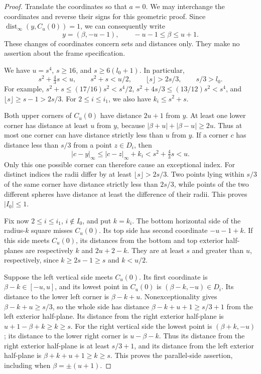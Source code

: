 \begin{proof}
Translate the coordinates so that \(a=0\).  We may interchange the
coordinates and reverse their signs for this geometric proof.  Since
\(\operatorname{dist}_\infty(y,C_u(0))=1\), we can consequently write
\[
 y=(\beta,-u-1),\qquad -u-1\le\beta\le u+1.
\]
These changes of coordinates concern sets and distances only.
They make no assertion about the frame specification.

We have \(u=s^4\), \(s\ge16\), and \(s\ge6(l_0+1)\).  In particular,
\[
 s^2+\tfrac43s<u,\qquad s^2+s<u/2,\qquad
 \lfloor s\rfloor>2s/3,\qquad s/3>l_0.
\]
For example, \(s^2+s\le(17/16)s^2<s^4/2\),
\(s^2+4s/3\le(13/12)s^2<s^4\), and
\(\lfloor s\rfloor\ge s-1>2s/3\).
For \(2\le i\le i_1\), we also have \(k_i\le s^2+s\).

Both upper corners of \(C_u(0)\) have distance \(2u+1\) from
\(y\).  At least one lower corner has distance at least \(u\)
from \(y\), because
\( |\beta+u|+|\beta-u|\ge2u\).
Thus at most one corner can have distance strictly less than \(u\)
from \(y\).  If a corner \(c\) has distance less than \(s/3\)
from a point \(z\in D_i\), then
\[
 |c-y|_\infty\le |c-z|_\infty+k_i
       <s^2+\tfrac43s<u.
\]
Only this one possible corner can therefore cause an exceptional
index.  For distinct indices the radii differ by at least
\(\lfloor s\rfloor>2s/3\).  Two points lying within \(s/3\)
of the same corner have distance strictly less than \(2s/3\),
while points of the two different spheres have distance at least
the difference of their radii.  This proves \(|I_0|\le1\).

Fix now \(2\le i\le i_1\), \(i\notin I_0\), and put \(k=k_i\).
The bottom horizontal side of the radius-\(k\) square misses
\(C_u(0)\).  Its top side has second coordinate \(-u-1+k\).
If this side meets \(C_u(0)\), its distances from the bottom and
top exterior half-planes are respectively \(k\) and \(2u+2-k\).
They are at least \(s\) and greater than \(u\), respectively,
since \(k\ge2s-1\ge s\) and \(k<u/2\).

Suppose the left vertical side meets \(C_u(0)\).  Its first
coordinate is \(\beta-k\in[-u,u]\), and its lowest point in
\(C_u(0)\) is \((\beta-k,-u)\in D_i\).  Its distance to the
lower left corner is \(\beta-k+u\).  Nonexceptionality gives
\(\beta-k+u\ge s/3\), so the whole side has distance
\(\beta-k+u+1\ge s/3+1\) from the left exterior half-plane.
Its distance from the right exterior half-plane is
\(u+1-\beta+k\ge k\ge s\).
For the right vertical side the lowest point is
\((\beta+k,-u)\); its distance to the lower right corner is
\(u-\beta-k\).  Thus its distance from the right exterior
half-plane is at least \(s/3+1\), and its distance from the
left exterior half-plane is \(\beta+k+u+1\ge k\ge s\).
This proves the parallel-side assertion, including when
\(\beta=\pm(u+1)\).


\end{proof}
